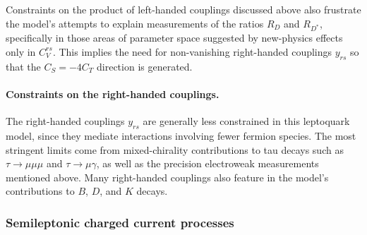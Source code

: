 Constraints on the product of left-handed couplings discussed above also
frustrate the model's attempts to explain measurements of the ratios $R_D$ and
$R_{D^{*}}$, specifically in those areas of parameter space suggested by
new-physics effects only in $C_V^{rs}$. This implies the need for non-vanishing
right-handed couplings $y_{rs}$ so that the $C_{S} = - 4 C_{T}$ direction is
generated.

\paragraph{Constraints on the right-handed couplings.} The right-handed
couplings $y_{rs}$ are generally less constrained in this leptoquark model,
since they mediate interactions involving fewer fermion species. The most
stringent limits come from mixed-chirality contributions to tau decays such as
$\tau \to \mu \mu \mu$ and $\tau \to \mu \gamma$, as well as the precision
electroweak measurements mentioned above. Many right-handed couplings also
feature in the model's contributions to $B$, $D$, and $K$ decays.

\subsubsection{Semileptonic charged current processes}
\label{sec:ch3-semileptonicchargedcurrentprocesses}


